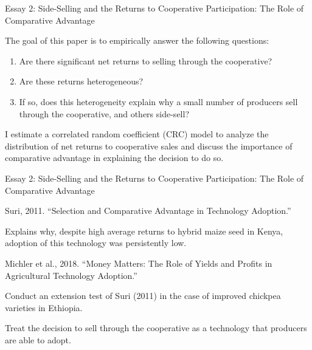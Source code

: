\documentclass[aspectratio=169]{beamer}
\newenvironment{wideitemize}{\itemize\addtolength{\itemsep}{10pt}}{\enditemize}
\begin{document}
\begin{frame}{Essay 2: Side-Selling and the Returns to Cooperative Participation: The Role of Comparative Advantage}
    \begin{wideitemize}
        \item The goal of this paper is to empirically answer the following questions: \vspace{.25cm}
            \begin{enumerate}
                \item Are there significant net returns to selling through the cooperative? \vspace{.25cm}
                \item Are these returns heterogeneous? \vspace{.25cm}
                \item If so, does this heterogeneity explain why a small number of producers sell through the cooperative, and others side-sell? 
            \end{enumerate}
        \item I estimate a correlated random coefficient (CRC) model to analyze the distribution of net returns to cooperative sales and discuss the importance of comparative advantage in explaining the decision to do so.     
    \end{wideitemize}
\end{frame}

\begin{frame}{Essay 2: Side-Selling and the Returns to Cooperative Participation: The Role of Comparative Advantage}
    \begin{wideitemize}
        \item Suri, 2011. ``Selection and Comparative Advantage in Technology Adoption.''
 \vspace{.25cm}
            \begin{wideitemize}
                \item Explains why, despite high average returns to hybrid maize seed in Kenya, adoption of this technology was persistently low.
            \end{wideitemize}
        \item Michler et al., 2018. ``Money Matters: The Role of Yields and Profits in Agricultural Technology Adoption.''
 \vspace{.25cm}
            \begin{wideitemize}
                \item Conduct an extension test of Suri (2011) in the case of improved chickpea varieties in Ethiopia.
            \end{wideitemize}        
        \item Treat the decision to sell through the cooperative as a technology that producers are able to adopt.
    \end{wideitemize}
\end{frame}
\end{document}
